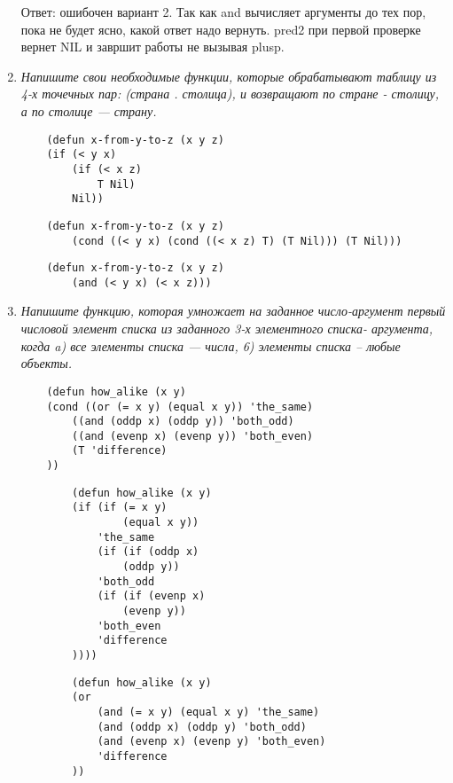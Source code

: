 \begin{enumerate}[wide=0pt]
		Ответ: ошибочен вариант 2. Так как and вычисляет аргументы до тех пор,
		пока не будет ясно, какой ответ надо вернуть. pred2 при первой проверке
		вернет NIL и завршит работы не вызывая plusp.

	\item  \textit{Напишите свои необходимые функции, 
	которые обрабатывают таблицу из
	4-х точечных пар:
	(страна . столица), и возвращают по стране - столицу, а по столице —
	страну.}
	
	\begin{lstlisting}
	(defun x-from-y-to-z (x y z)
	(if (< y x)
		(if (< x z)
			T Nil)
		Nil))
	\end{lstlisting}

	\begin{lstlisting}
	(defun x-from-y-to-z (x y z)
		(cond ((< y x) (cond ((< x z) T) (T Nil))) (T Nil)))
	\end{lstlisting}

	\begin{lstlisting}
	(defun x-from-y-to-z (x y z)
		(and (< y x) (< x z)))
	\end{lstlisting}


	\item  \textit{Напишите функцию, которая умножает на заданное число-аргумент
	первый числовой элемент списка из заданного 3-х элементного списка-
	аргумента, когда
	a) все элементы списка --- числа,
	6) элементы списка -- любые объекты.}

	\begin{lstlisting}
	(defun how_alike (x y)
    (cond ((or (= x y) (equal x y)) 'the_same)
        ((and (oddp x) (oddp y)) 'both_odd)
        ((and (evenp x) (evenp y)) 'both_even)
        (T 'difference)
	))
	\end{lstlisting}


	\begin{lstlisting}
		(defun how_alike (x y)
		(if (if (= x y)
				(equal x y))
			'the_same
			(if (if (oddp x)
				(oddp y))
			'both_odd
			(if (if (evenp x)
				(evenp y))
			'both_even
			'difference
		))))
	\end{lstlisting}


	\begin{lstlisting}
		(defun how_alike (x y)
		(or
			(and (= x y) (equal x y) 'the_same)
			(and (oddp x) (oddp y) 'both_odd)
			(and (evenp x) (evenp y) 'both_even)
			'difference
		))
	\end{lstlisting}



\end{enumerate}